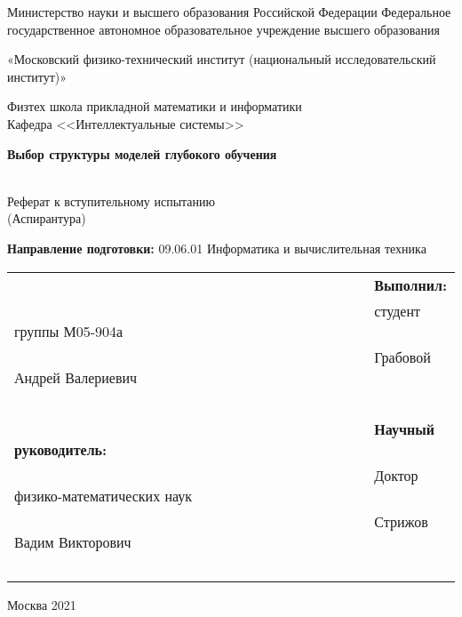 \begin{titlepage}
    	\begin{center}
        		Министерство науки и высшего образования Российской Федерации Федеральное государственное автономное образовательное учреждение высшего образования
       
		«Московский физико-технический институт (национальный исследовательский институт)»

        		Физтех школа прикладной математики и информатики\\
        		Кафедра <<Интеллектуальные системы>>\\
    	\end{center}

    	\vspace{2cm}

    	\begin{center}
       		\Large \bf Выбор структуры моделей глубокого обучения
    	\end{center}
    
    	\begin{center}
		~\\[-28pt]
		Реферат к вступительному испытанию\\
		(Аспирантура)
	\end{center}
	
	\vspace{0.1cm}
	    
    \begin{center}
    	\textbf{Направление подготовки:} 09.06.01 Информатика и вычислительная техника
    \end{center}

   \vspace{0.1cm}

	\begin{flushright}
		\begin{table}[!ht]
			\centering
			\begin{tabular}{l}
				~~~~~~~~~~~~~~~~~~~~~~~~~~~~~~~~~~~~~~~~~~~~~~~~~~ \textbf{Выполнил:}\\
				~~~~~~~~~~~~~~~~~~~~~~~~~~~~~~~~~~~~~~~~~~~~~~~~~~ студент группы М05-904а\\
				~~~~~~~~~~~~~~~~~~~~~~~~~~~~~~~~~~~~~~~~~~~~~~~~~~ Грабовой Андрей Валериевич\\
				~~~~~~~~~~~~~~~~~~~~~~~~~~~~~~~~~~~~~~~~~~~~~~~~~~\\
				~~~~~~~~~~~~~~~~~~~~~~~~~~~~~~~~~~~~~~~~~~~~~~~~~~ \textbf{Научный руководитель:}\\
				~~~~~~~~~~~~~~~~~~~~~~~~~~~~~~~~~~~~~~~~~~~~~~~~~~ Доктор физико-математических наук\\
				~~~~~~~~~~~~~~~~~~~~~~~~~~~~~~~~~~~~~~~~~~~~~~~~~~ Стрижов Вадим Викторович\\
				~~~~~~~~~~~~~~~~~~~~~~~~~~~~~~~~~~~~~~~~~~~~~~~~~~ \\
	    	\end{tabular}
	    \end{table}
	\end{flushright}


	\begin{center}
		Москва 2021
	\end{center}

\end{titlepage}


